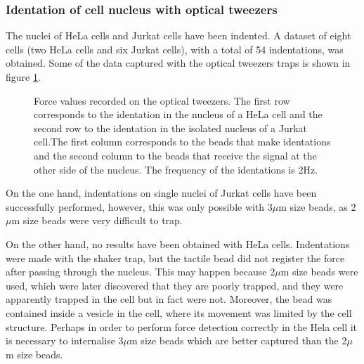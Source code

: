 \documentclass[12pt, a4paper]{article} %
\begin{document}
	\setlength{\parskip}{0mm}
	
	\subsubsection{Identation of cell nucleus with optical tweezers}
	
	The nuclei of HeLa cells and Jurkat cells have been indented. A dataset of eight cells (two HeLa cells and six Jurkat cells), with a total of 54 indentations, was obtained. Some of the data captured with the optical tweezers traps is shown in figure \ref{fig:raw_data_cells}.
	
	\setlength{\parskip}{4mm}
	
	\begin{figure}[htbp]
		\centering
		
		\caption{Force values recorded on the optical tweezers. The first row corresponds to the identation in the nucleus of a HeLa cell and the second row to the identation in the isolated nucleus of a Jurkat cell.The first column corresponds to the beads that make identations and the second column to the beads that receive the signal at the other side of the nucleus. The frequency of the identations is 2Hz.}
		\label{fig:raw_data_cells}
	\end{figure}
	On the one hand, indentations on single nuclei of Jurkat cells have been successfully performed, however, this was only possible with 3$\mu$m size beads, as 2$\mu$m size beads were very difficult to trap. 
	
	On the other hand, no results have been obtained with HeLa cells. Indentations were made with the shaker trap, but the tactile bead did not register the force after passing through the nucleus. This may happen because 2$\mu$m size beads were used, which were later discovered that they are poorly trapped, and they were apparently trapped in the cell but in fact were not. Moreover, the bead was contained inside a vesicle in the cell, where its movement was limited by the cell structure. Perhaps in order to perform force detection correctly in the Hela cell it is necessary to internalise 3$\mu$m size beads which are better captured than the 2$\mu$m size beads.
	\setlength{\parskip}{0mm}
	
\end{document}

